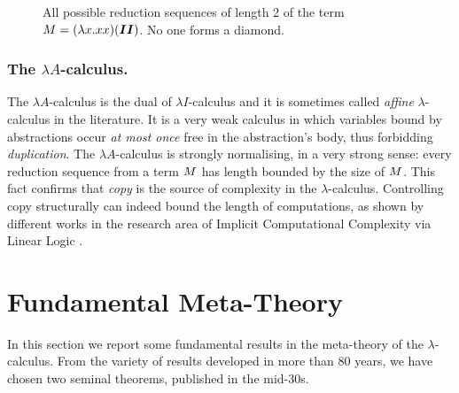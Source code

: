 \begin{figure}
	\caption{All possible reduction sequences of length 2 of the term $M=(\lambda x.xx)(\bm{II})$. No one forms a diamond.}
	\label{figure:couterexample}
\end{figure}
\subsubsection{The $\lambda A$-calculus.}
The $\lambda A$-calculus is the dual of $\lambda I$-calculus and it is
sometimes called \emph{affine} $\lambda$-calculus in the
literature. It is a very weak calculus in which variables bound by
abstractions occur \emph{at most once} free in the abstraction's body,
thus forbidding \emph{duplication}. The $\lambda A$-calculus is strongly
normalising, in a very strong sense: every reduction sequence from a term
$M$ has length bounded by the size of $M$. This fact confirms that \emph{copy} is the source of complexity in the $\lambda$-calculus. Controlling copy structurally can indeed bound the length of computations, as shown by different works \cite{baillot_soft_2004,terui_light_2007} in the research area of Implicit Computational Complexity \cite{dal_lago_short_2012} via Linear Logic \cite{girard_linear_1987}.
\section{Fundamental Meta-Theory}
In this section we report some fundamental results in the meta-theory of the $\lambda$-calculus. From the variety of results developed in more than 80 years, we have chosen two seminal theorems, published in the mid-30s.
